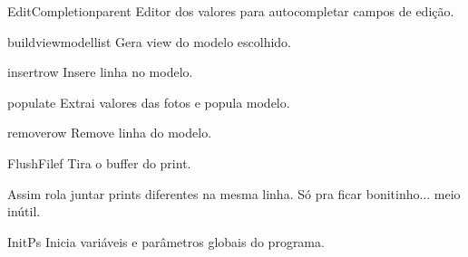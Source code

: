 \documentclass[letterpaper,10pt,portuguese]{manual}
\begin{document}
\hypertarget{veliger.EditCompletion}{}\begin{classdesc}{EditCompletion}{parent}
Editor dos valores para autocompletar campos de edição.

\hypertarget{veliger.EditCompletion.buildview}{}\begin{methoddesc}{buildview}{modellist}
Gera view do modelo escolhido.
\end{methoddesc}

\hypertarget{veliger.EditCompletion.insertrow}{}\begin{methoddesc}{insertrow}{}
Insere linha no modelo.
\end{methoddesc}

\hypertarget{veliger.EditCompletion.populate}{}\begin{methoddesc}{populate}{}
Extrai valores das fotos e popula modelo.
\end{methoddesc}

\hypertarget{veliger.EditCompletion.removerow}{}\begin{methoddesc}{removerow}{}
Remove linha do modelo.
\end{methoddesc}
\end{classdesc}

\hypertarget{veliger.FlushFile}{}\begin{classdesc}{FlushFile}{f}
Tira o buffer do print.

Assim rola juntar prints diferentes na mesma linha. Só pra ficar
bonitinho... meio inútil.
\end{classdesc}

\hypertarget{veliger.InitPs}{}\begin{classdesc}{InitPs}{}
Inicia variáveis e parâmetros globais do programa.
\end{classdesc}
\end{document}
